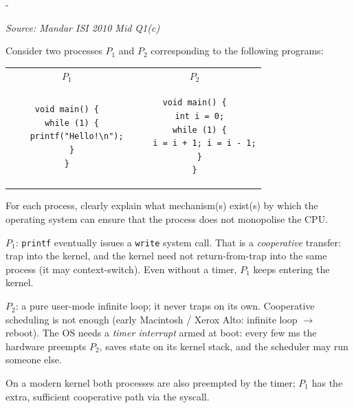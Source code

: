 \documentclass[11pt,a4paper]{article}
\makeatletter
\newcommand{\keepspace}[1]{\par\penalty-100\begingroup
  \setlength{\dimen@}{#1}\dimen@ii\pagegoal\advance\dimen@ii-\pagetotal
  \ifdim\dimen@>\dimen@ii\ifdim\dimen@ii>\z@\vfil\fi\break\fi\endgroup}
\newcounter{qn}[section]
\newenvironment{Qn}[4]{%
  \refstepcounter{qn}\keepspace{7\baselineskip}%
  \begin{tcolorbox}[qboxstyle, title={Q\thesection.\theqn\ \ [#1 \textbar\ #2]\ \ #4}]%
  {\footnotesize\color{g3}\textit{Source: #3}}\par\smallskip%
}{%
  \end{tcolorbox}%
}
\newenvironment{Sol}{%
  \begin{tcolorbox}[sboxstyle, title={Solution}]%
}{%
  \end{tcolorbox}\vspace{0.35em}%
}
\makeatother
\begin{document}
\begin{Qn}{Medium-Hard}{Lect 4}{Mandar ISI 2010 Mid Q1(c)}{Stopping a \texttt{printf} loop vs.\ a tight arithmetic loop}
Consider two processes $P_1$ and $P_2$ corresponding to the following programs:
\begin{center}
\begin{tabular}{cc}
$P_1$ & $P_2$ \\
\begin{lstlisting}[numbers=none]
void main() {
  while (1) {
    printf("Hello!\n");
  }
}
\end{lstlisting}
&
\begin{lstlisting}[numbers=none]
void main() {
  int i = 0;
  while (1) {
    i = i + 1; i = i - 1;
  }
}
\end{lstlisting}
\end{tabular}
\end{center}
For each process, clearly explain what mechanism(s) exist(s) by which the operating system can ensure that the process does not monopolise the CPU.
\end{Qn}
\begin{Sol}
$P_1$: \texttt{printf} eventually issues a \texttt{write} system call. That is a \emph{cooperative} transfer: trap into the kernel, and the kernel need not return-from-trap into the same process (it may context-switch). Even without a timer, $P_1$ keeps entering the kernel.

$P_2$: a pure user-mode infinite loop; it never traps on its own. Cooperative scheduling is not enough (early Macintosh / Xerox Alto: infinite loop $\to$ reboot). The OS needs a \emph{timer interrupt} armed at boot: every few ms the hardware preempts $P_2$, saves state on its kernel stack, and the scheduler may run someone else.

On a modern kernel both processes are also preempted by the timer; $P_1$ has the extra, sufficient cooperative path via the syscall.
\end{Sol}
\end{document}
